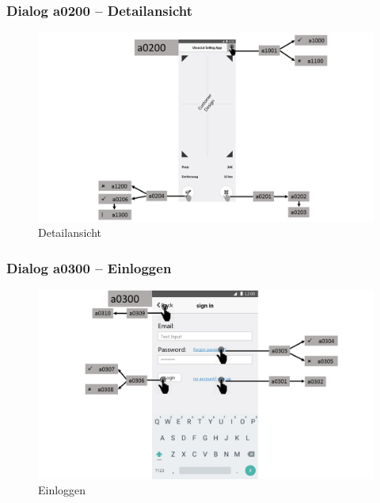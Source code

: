 \documentclass[a4paper,12pt,oneside]{scrartcl}
\begin{document}
\subsubsection{Dialog a0200 – Detailansicht}
\begin{figure}[!htbp]
\centering
\noindent\includegraphics[width=\linewidth,height=\textheight,keepaspectratio]{Dialoge/Folie3}
\caption{Detailansicht}
\end{figure}
\FloatBarrier

\subsubsection{Dialog a0300 – Einloggen}
\begin{figure}[!htbp]
\centering
\noindent\includegraphics[width=\linewidth,height=\textheight,keepaspectratio]{Dialoge/Folie4}
\caption{Einloggen}
\end{figure}
\FloatBarrier
\end{document}
